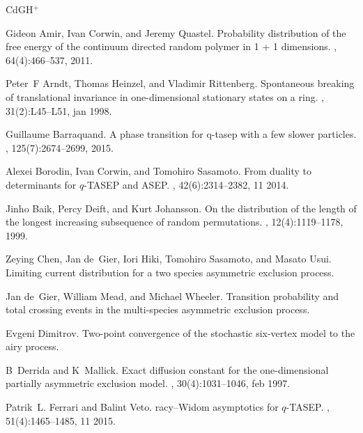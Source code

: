 \newcommand{\etalchar}[1]{$^{#1}$}
\def\cprime{$'$} \def\Dbar{\leavevmode\lower.6ex\hbox to 0pt{\hskip-.23ex
  \accent"16\hss}D} \def\cprime{$'$}
\begin{thebibliography}{CdGH{\etalchar{+}}}

Gideon Amir, Ivan Corwin, and Jeremy Quastel.
\newblock Probability distribution of the free energy of the continuum directed
  random polymer in 1 + 1 dimensions.
, 64(4):466--537,
  2011.

Peter~F Arndt, Thomas Heinzel, and Vladimir Rittenberg.
\newblock Spontaneous breaking of translational invariance in one-dimensional
  stationary states on a ring.
, 31(2):L45--L51,
  jan 1998.

Guillaume Barraquand.
\newblock A phase transition for q-tasep with a few slower particles.
, 125(7):2674--2699,
  2015.

Alexei Borodin, Ivan Corwin, and Tomohiro Sasamoto.
\newblock From duality to determinants for $q$-{TASEP} and {ASEP}.
, 42(6):2314--2382, 11 2014.

Jinho Baik, Percy Deift, and Kurt Johansson.
\newblock On the distribution of the length of the longest increasing
  subsequence of random permutations.
, 12(4):1119--1178, 1999.


\bibitem[CdGH{\etalchar{+}}]{AHR}
Zeying Chen, Jan de~Gier, Iori Hiki, Tomohiro Sasamoto, and Masato Usui.
\newblock Limiting current distribution for a two species asymmetric exclusion
  process.

Jan de~Gier, William Mead, and Michael Wheeler.
\newblock Transition probability and total crossing events in the multi-species
  asymmetric exclusion process.

Evgeni Dimitrov.
\newblock Two-point convergence of the stochastic six-vertex model to the airy
  process.

B~Derrida and K~Mallick.
\newblock Exact diffusion constant for the one-dimensional partially asymmetric
  exclusion model.
,
  30(4):1031--1046, feb 1997.

Patrik~L. Ferrari and Balint Veto.
racy--{W}idom asymptotics for $q$-{TASEP}.
, 51(4):1465--1485, 11
  2015.




\end{thebibliography}
